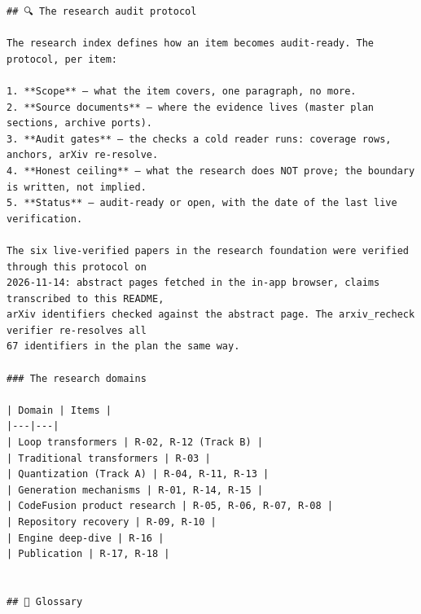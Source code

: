 \begin{Verbatim}[breaklines,breakanywhere,fontsize=\footnotesize]
## 🔍 The research audit protocol

The research index defines how an item becomes audit-ready. The protocol, per item:

1. **Scope** — what the item covers, one paragraph, no more.
2. **Source documents** — where the evidence lives (master plan sections, archive ports).
3. **Audit gates** — the checks a cold reader runs: coverage rows, anchors, arXiv re-resolve.
4. **Honest ceiling** — what the research does NOT prove; the boundary is written, not implied.
5. **Status** — audit-ready or open, with the date of the last live verification.

The six live-verified papers in the research foundation were verified through this protocol on
2026-11-14: abstract pages fetched in the in-app browser, claims transcribed to this README,
arXiv identifiers checked against the abstract page. The arxiv_recheck verifier re-resolves all
67 identifiers in the plan the same way.

### The research domains

| Domain | Items |
|---|---|
| Loop transformers | R-02, R-12 (Track B) |
| Traditional transformers | R-03 |
| Quantization (Track A) | R-04, R-11, R-13 |
| Generation mechanisms | R-01, R-14, R-15 |
| CodeFusion product research | R-05, R-06, R-07, R-08 |
| Repository recovery | R-09, R-10 |
| Engine deep-dive | R-16 |
| Publication | R-17, R-18 |


## 📖 Glossary


\end{Verbatim}
